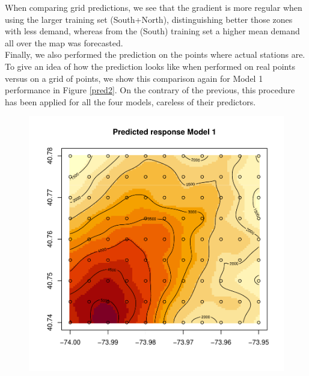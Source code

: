 \documentclass[12pt]{article}
\begin{document}
\noindent
When comparing grid predictions, we see that the gradient is more regular when using the larger training set (South+North), distinguishing better those zones with less demand, whereas from the (South) training set a higher mean demand all over the map was forecasted.\\

\noindent
Finally, we also performed the prediction on the points where actual stations are. To give an idea of how the prediction looks like when performed on real points versus on a grid of points, we show this comparison again for Model 1 performance in Figure \ref{pred2}. On the contrary of the previous, this procedure has been applied for all the four models, careless of their predictors. \\


\begin{figure}[H]
	\centering
	\includegraphics[scale=0.50]{Plots_North+South/v1_both_pred_grid.pdf}

\end{figure}
\end{document}
